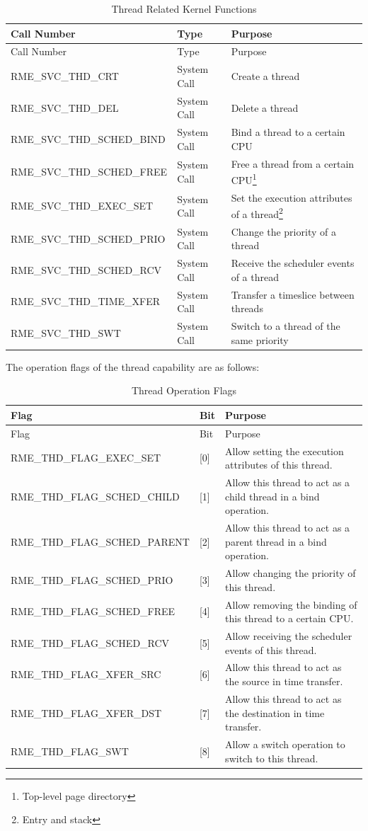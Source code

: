 \begin{xltabular}{\textwidth}{@{}>{\hsize\raggedright\arraybackslash}X>{\hsize\raggedright\arraybackslash}X>{\hsize\raggedright\arraybackslash}X@{}}
\caption{Thread Related Kernel Functions}\label{tab:4-18-thread-related-kernel-functions}\\
\toprule
Call Number & Type & Purpose\tabularnewline
\endfirsthead
\toprule
Call Number & Type & Purpose\tabularnewline
\midrule
\endhead
\bottomrule
\endlastfoot
RME\_SVC\_THD\_CRT & System Call & Create a thread\tabularnewline
RME\_SVC\_THD\_DEL & System Call & Delete a thread\tabularnewline
RME\_SVC\_THD\_SCHED\_BIND & System Call & Bind a thread to a certain CPU\tabularnewline
RME\_SVC\_THD\_SCHED\_FREE & System Call &
Free a thread from a certain CPU\footnote{Top-level page directory}\tabularnewline
RME\_SVC\_THD\_EXEC\_SET & System Call &
Set the execution attributes of a thread\footnote{Entry and stack}\tabularnewline
RME\_SVC\_THD\_SCHED\_PRIO & System Call & Change the priority of a thread\tabularnewline
RME\_SVC\_THD\_SCHED\_RCV & System Call &
Receive the scheduler events of a thread\tabularnewline
RME\_SVC\_THD\_TIME\_XFER & System Call & Transfer a timeslice between threads\tabularnewline
RME\_SVC\_THD\_SWT & System Call & Switch to a thread of the same priority\tabularnewline
\end{xltabular}
\nopagebreak[4]

The operation flags of the thread capability are as follows:

\begin{xltabular}{\textwidth}{@{}>{\hsize\raggedright\arraybackslash}X>{\hsize\raggedright\arraybackslash}X>{\hsize\raggedright\arraybackslash}X@{}}
\caption{Thread Operation Flags}\label{tab:4-19-thread-operation-flags}\\
\toprule
Flag & Bit & Purpose\tabularnewline
\endfirsthead
\toprule
Flag & Bit & Purpose\tabularnewline
\midrule
\endhead
\bottomrule
\endlastfoot
RME\_THD\_FLAG\_EXEC\_SET & {[}0{]} &
Allow setting the execution attributes of this thread.\tabularnewline
RME\_THD\_FLAG\_SCHED\_CHILD & {[}1{]} &
Allow this thread to act as a child thread in a bind operation.\tabularnewline
RME\_THD\_FLAG\_SCHED\_PARENT & {[}2{]} &
Allow this thread to act as a parent thread in a bind operation.\tabularnewline
RME\_THD\_FLAG\_SCHED\_PRIO & {[}3{]} &
Allow changing the priority of this thread.\tabularnewline
RME\_THD\_FLAG\_SCHED\_FREE & {[}4{]} &
Allow removing the binding of this thread to a certain CPU.\tabularnewline
RME\_THD\_FLAG\_SCHED\_RCV & {[}5{]} &
Allow receiving the scheduler events of this thread.\tabularnewline
RME\_THD\_FLAG\_XFER\_SRC & {[}6{]} &
Allow this thread to act as the source in time transfer.\tabularnewline
RME\_THD\_FLAG\_XFER\_DST & {[}7{]} &
Allow this thread to act as the destination in time transfer.\tabularnewline
RME\_THD\_FLAG\_SWT & {[}8{]} &
Allow a switch operation to switch to this thread.\tabularnewline
\end{xltabular}
\nopagebreak[4]

